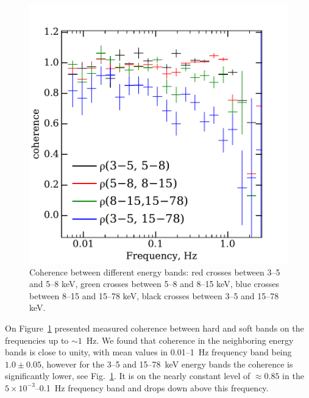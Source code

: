 \documentclass[a4paper,fleqn,usenatbib]{mnras}
\begin{document}
\begin{figure}
    \includegraphics[width=\columnwidth]{coherence_4.pdf}
    \caption{Coherence between different energy bands:  red crosses between 3--5 and 5--8 keV,
     green crosses between 5--8 and 8--15 keV, blue crosses between 8--15 and 15--78 keV, black crosses between 3--5 and 15--78 keV.}
    \label{fig:coherence}
\end{figure}

On Figure~\ref{fig:coherence} presented measured coherence between hard and soft bands on the frequencies up to $\sim1$~Hz. 
We found that coherence in the neighboring energy bands is close to unity, with mean values in 0.01--1~Hz frequency band being $1.0\pm0.05$, however  for the 3--5 and 15--78~keV energy bands the coherence is significantly lower, see Fig.~\ref{fig:coherence}. 
It is on the nearly constant level of $\approx0.85$ in the $5\times10^{-3}$--0.1~Hz frequency band and drops down above this frequency.
\end{document}
